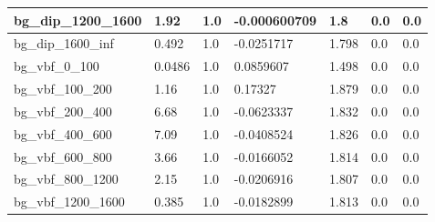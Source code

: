 \documentclass[a4paper, 10pt]{article}
\begin{document}
\begin{table}[H]
\begin{center}
\begin{tabular}{|m{23.0mm}|m{23.0mm}|m{18.0mm}|m{19.0mm}|m{19.0mm}|m{19.0mm}|m{19.0mm}|}
      \hline
      {\cellcolor{white}         bg\_dip\_1200\_1600}& {\cellcolor{white}         1.92}& {\cellcolor{white}         1.0}& {\cellcolor{white}         -0.000600709}& {\cellcolor{white}         1.8}& {\cellcolor{green}         0.0}& {\cellcolor{green}         0.0}\\
      \hline
      {\cellcolor{white}         bg\_dip\_1600\_inf}& {\cellcolor{white}         0.492}& {\cellcolor{white}         1.0}& {\cellcolor{white}         -0.0251717}& {\cellcolor{white}         1.798}& {\cellcolor{green}         0.0}& {\cellcolor{green}         0.0}\\
      \hline
      {\cellcolor{white}         bg\_vbf\_0\_100}& {\cellcolor{white}         0.0486}& {\cellcolor{white}         1.0}& {\cellcolor{white}         0.0859607}& {\cellcolor{white}         1.498}& {\cellcolor{green}         0.0}& {\cellcolor{green}         0.0}\\
      \hline
      {\cellcolor{white}         bg\_vbf\_100\_200}& {\cellcolor{white}         1.16}& {\cellcolor{white}         1.0}& {\cellcolor{white}         0.17327}& {\cellcolor{white}         1.879}& {\cellcolor{green}         0.0}& {\cellcolor{green}         0.0}\\
      \hline
      {\cellcolor{white}         bg\_vbf\_200\_400}& {\cellcolor{white}         6.68}& {\cellcolor{white}         1.0}& {\cellcolor{white}         -0.0623337}& {\cellcolor{white}         1.832}& {\cellcolor{green}         0.0}& {\cellcolor{green}         0.0}\\
      \hline
      {\cellcolor{white}         bg\_vbf\_400\_600}& {\cellcolor{white}         7.09}& {\cellcolor{white}         1.0}& {\cellcolor{white}         -0.0408524}& {\cellcolor{white}         1.826}& {\cellcolor{green}         0.0}& {\cellcolor{green}         0.0}\\
      \hline
      {\cellcolor{white}         bg\_vbf\_600\_800}& {\cellcolor{white}         3.66}& {\cellcolor{white}         1.0}& {\cellcolor{white}         -0.0166052}& {\cellcolor{white}         1.814}& {\cellcolor{green}         0.0}& {\cellcolor{green}         0.0}\\
      \hline
      {\cellcolor{white}         bg\_vbf\_800\_1200}& {\cellcolor{white}         2.15}& {\cellcolor{white}         1.0}& {\cellcolor{white}         -0.0206916}& {\cellcolor{white}         1.807}& {\cellcolor{green}         0.0}& {\cellcolor{green}         0.0}\\
      \hline
      {\cellcolor{white}         bg\_vbf\_1200\_1600}& {\cellcolor{white}         0.385}& {\cellcolor{white}         1.0}& {\cellcolor{white}         -0.0182899}& {\cellcolor{white}         1.813}& {\cellcolor{green}         0.0}& {\cellcolor{green}         0.0}\\

\end{tabular}
\end{center}
\end{table}
\end{document}
